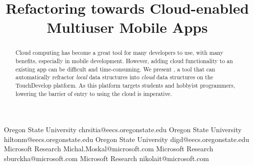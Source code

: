 \documentclass{sigplanconf}
\begin{document}
\setlength{\pdfpageheight}{\paperheight}
\setlength{\pdfpagewidth}{\paperwidth}






\title{Refactoring towards Cloud-enabled Multiuser Mobile Apps}

           {Oregon State University}
           {chrsitia@eecs.oregonstate.edu}
           {Oregon State University}
           {hiltonm@eecs.oregonstate.edu}
           {Oregon State University}
           {digd@eecs.oregonstate.edu}
           {Microsoft Research}
           {Michal.Moskal@microsoft.com}
           {Microsoft Research}
           {sburckha@microsoft.com}
           {Microsoft Research}
           {nikolait@microsoft.com}
\maketitle


\begin{abstract}
Cloud computing has become a great tool for many developers to use, with many benefits, especially in mobile development.  However, adding cloud functionality to an existing app can be difficult and time-consuming. We present \tool, a tool that can automatically refractor \emph{local} data structures into \emph{cloud} data structures on the TouchDevelop platform.  As this platform targets students and hobbyist programmers, lowering the barrier of entry to using the cloud is imperative.  

\end{abstract}
\end{document}
